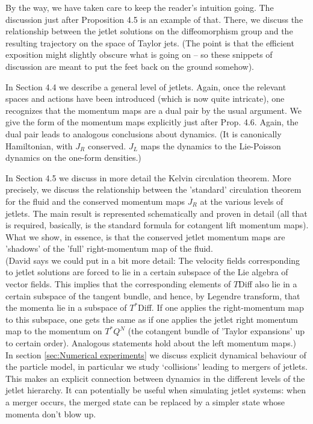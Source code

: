\documentclass[12pt]{amsart}
\begin{document}
By the way, we have taken care to keep the reader's intuition going. The discussion just after Proposition 4.5 is an example of that. There, we discuss the relationship between the jetlet solutions on the diffeomorphism group and the resulting trajectory on the space of Taylor jets. (The point is that the efficient exposition might slightly obscure what is going on -- so these snippets of discussion are meant to put the feet back on the ground somehow).

In Section 4.4 we describe a general level of jetlets. Again, once the relevant spaces and actions have been introduced (which is now quite intricate), one recognizes that the momentum maps are a dual pair by the usual argument. We give the form of the momentum maps explicitly just after Prop. 4.6. Again, the dual pair leads to analogous conclusions about dynamics. (It is canonically Hamiltonian, with $J_R$  conserved. $J_L$ maps the dynamics to the Lie-Poisson dynamics on the one-form densities.)

In Section 4.5 we discuss in more detail the Kelvin circulation theorem. More precisely, we discuss the relationship between the 'standard' circulation theorem for the fluid and the conserved momentum maps $J_R$  at the various levels of jetlets. The main result is represented schematically and proven in detail (all that is required, basically, is the standard formula for cotangent lift momentum maps). What we show, in essence, is that the conserved jetlet momentum maps are 'shadows' of the 'full' right-momentum map of the fluid.\\

(David says we could put in a bit more detail: The velocity fields corresponding to jetlet solutions are forced to lie in a certain subspace of the Lie algebra of vector fields. This implies that the corresponding elements of $T$Diff also lie in a certain subspace of the tangent bundle, and hence, by Legendre transform, that the momenta lie in a subspace of $T^*$Diff. If one applies the right-momentum map to this subspace, one gets the same as if one applies the jetlet right momentum map to the momentum on $T^*Q^N$ (the cotangent bundle of 'Taylor expansions' up to certain order). Analogous statements hold about the left momentum maps.)\\


In section \ref{sec:Numerical experiments} we discuss explicit dynamical behaviour of the
particle model, in particular we study `collisions' leading to mergers of jetlets.
This makes an explicit connection between dynamics in the different
levels of the jetlet hierarchy. It can potentially be useful when
simulating jetlet systems: when a merger occurs, the merged state can be
replaced by a simpler state whose momenta don't blow up.
\end{document}
